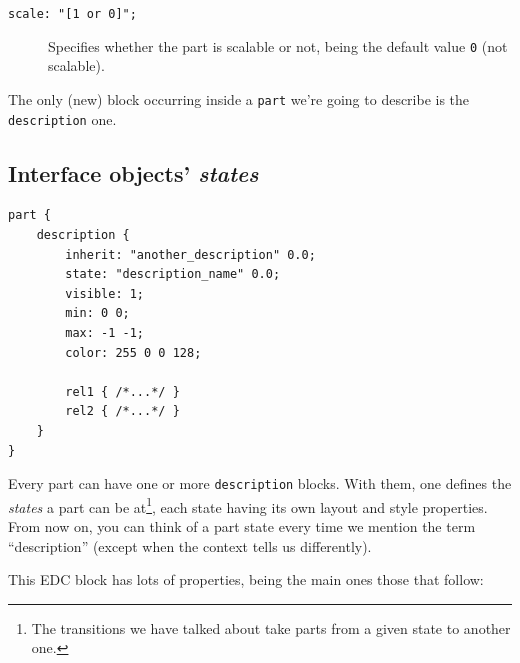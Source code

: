\documentclass[a4paper]{profusion}
\begin{document}
\begin{description}
\item[\texttt{scale: "[1 or 0]";}] Specifies whether the part is
  scalable or not, being the default value \texttt{0} (not scalable).
\end{description}

The only (new) block occurring inside a \texttt{part} we're going to
describe is the \texttt{description} one.

\subsection{Interface objects' \emph{states}}
\label{sec:states}

\begin{lstlisting}
part {
    description {
        inherit: "another_description" 0.0;
        state: "description_name" 0.0;
        visible: 1;
        min: 0 0;
        max: -1 -1;
        color: 255 0 0 128;

        rel1 { /*...*/ }
        rel2 { /*...*/ }
    }
}
\end{lstlisting}

Every part can have one or more \texttt{description} blocks. With
them, one defines the \emph{states} a part can be at\footnote{The
  transitions we have talked about take parts from a given state to
  another one.}, each state having its own layout and style
properties. From now on, you can think of a part state every time we
mention the term ``description'' (except when the context tells us
differently).

This EDC block has lots of properties, being the main ones those that
follow:
\end{document}
